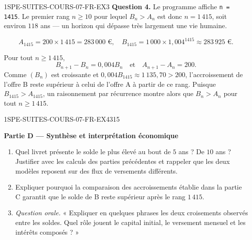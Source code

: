 \begin{corrige}{1SPE-SUITES-COURS-07-FR-EX3}
\textbf{Question 4.} Le programme affiche \texttt{n = 1415}. Le premier rang
$n\geqslant10$ pour lequel $B_n>A_n$ est donc $n=1\,415$, soit environ
$118$ ans — un horizon qui dépasse très largement une vie humaine.

\[
  A_{1415} = 200 \times 1\,415 = 283\,000 \text{ €}, \quad B_{1415} = 1\,000 \times 1{,}004^{1415} \approx 283\,925 \text{ €.}
\]

Pour tout $n\geqslant1\,415$,
\[
B_{n+1}-B_n=0{,}004B_n
\quad\text{et}\quad
A_{n+1}-A_n=200.
\]
Comme $(B_n)$ est croissante et
$0{,}004B_{1415}\approx1\,135{,}70>200$, l'accroissement de l'offre B reste
supérieur à celui de l'offre A à partir de ce rang. Puisque
$B_{1415}>A_{1415}$, un raisonnement par récurrence montre alors que
$B_n>A_n$ pour tout $n\geqslant1\,415$.

\end{corrige}

\bigskip


\begin{exercice}{1SPE-SUITES-COURS-07-FR-EX4}{3}{15}

\textbf{Partie D — Synthèse et interprétation économique}

\begin{enumerate}
  \item Quel livret présente le solde le plus élevé au bout de $5$ ans ? De
  $10$ ans ? Justifier avec les calculs des parties précédentes et rappeler que
  les deux modèles reposent sur des flux de versements différents.
  \item Expliquer pourquoi la comparaison des accroissements établie dans la
  partie C garantit que le solde de B reste supérieur après le rang $1\,415$.
  \item \pictoOral{} \textit{Question orale.} « Expliquer en quelques phrases
  les deux croisements observés entre les soldes. Quel rôle jouent le capital
  initial, le versement mensuel et les intérêts composés ? »
\end{enumerate}

\end{exercice}

